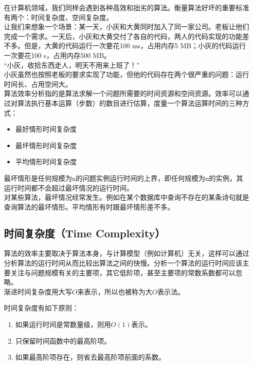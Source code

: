 在计算机领域，我们同样会遇到各种高效和拙劣的算法。衡量算法好坏的重要标准有两个：时间复杂度、空间复杂度。\\

让我们来想象一个场景：某一天，小灰和大黄同时加入了同一家公司。老板让他们完成一个需求。一天后，小灰和大黄交付了各自的代码，两人的代码实现的功能差不多。但是，大黄的代码运行一次要花100 ms，占用内存5 MB；小灰的代码运行一次要花100 s，占用内存500 MB。\\

“小灰，收拾东西走人，明天不用来上班了！”\\

小灰虽然也按照老板的要求实现了功能，但他的代码存在两个很严重的问题：运行时间长、占用空间大。\\

算法效率分析指的是算法求解一个问题所需要的时间资源和空间资源。效率可以通过对算法执行基本运算（步数）的数目进行估算，度量一个算法运算时间的三种方式：

\begin{itemize}
	\item 最好情形时间复杂度
	\item 最坏情形时间复杂度
	\item 平均情形时间复杂度
\end{itemize}

最坏情形是任何规模为n的问题实例运行时间的上界，即任何规模为n的实例，其运行时间都不会超过最坏情况的运行时间。\\

对某些算法，最坏情况经常发生。例如在某个数据库中查询不存在的某条诗句就是查询算法的最坏情形。平均情形有时跟最坏情形差不多。\\

\subsection{时间复杂度（Time Complexity）}

算法的效率主要取决于算法本身，与计算模型（例如计算机）无关，这样可以通过分析算法的运行时间从而比较出算法之间的快慢。分析一个算法的运行时间应该主要关注与问题规模有关的主要项，其它低阶项，甚至主要项的常数系数都可以忽略。\\

渐进时间复杂度用大写$ O $来表示，所以也被称为大$ O $表示法。

时间复杂度有如下原则：

\begin{enumerate}
	\item 如果运行时间是常数量级，则用$ O(1) $表示。
	\item 只保留时间函数中的最高阶项。
	\item 如果最高阶项存在，则省去最高阶项前面的系数。
\end{enumerate}

